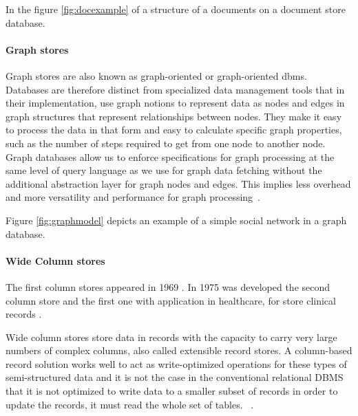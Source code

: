 In the figure \ref{fig:docexample} of a structure of a documents on a document store database.



\paragraph{Graph stores}

Graph stores are also known as graph-oriented or graph-oriented \gls{dbms}.
Databases are therefore distinct from specialized data management tools that in their implementation, use graph notions to represent data as nodes and edges in graph structures that represent relationships between nodes. They make it easy to process the data in that form and easy to calculate specific graph properties, such as the number of steps required to get from one node to another node. Graph databases allow us to enforce specifications for graph processing at the same level of query language as we use for graph data fetching without the additional abstraction layer for graph nodes and edges. This implies less overhead and more versatility and performance for graph processing~\cite{6313676,angles2008survey,nosqlchoose}.

Figure \ref{fig:graphmodel} depicts an example of a simple social network in a graph database.



\paragraph{Wide Column stores}

The first column stores appeared in 1969 \cite{abadi2009column}. In 1975 was developed the second column store and the first one with application in healthcare, for store clinical records \cite{WEYL1975279}.

Wide column stores store data in records with the capacity to carry very large numbers of complex columns, also called extensible record stores. A column-based record solution works well to act as write-optimized operations for these types of semi-structured data and it is not the case in the conventional relational DBMS that it is not optimized to write data to a smaller subset of records in order to update the records, it must read the whole set of tables. ~\cite{wuoverview,nosqlchoose}.

